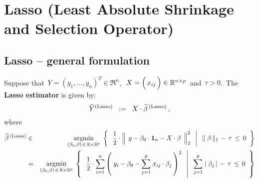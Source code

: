 
\section{Lasso (Least Absolute Shrinkage and Selection Operator)}
\setcounter{theorem}{0}

\renewcommand{\theenumi}{\roman{enumi}}
\renewcommand{\labelenumi}{\textnormal{(\theenumi)}$\;\;$}


\vskip 0.3cm
\subsection{Lasso -- general formulation}
\vskip 0.0cm
\noindent
Suppose that
\,$Y = (y_{1},\ldots,y_{n})^{T} \in \Re^{n}$,\,
\,$X = \left(\,\overset{{\color{white}-}}{x_{ij}}\,\right)\in\Re^{n \times p}$\, and
\,$\tau > 0$.\,
The \textbf{Lasso estimator} is given by:
\begin{equation*}
\widehat{Y}^{\textnormal{(Lasso)}}
\;\; := \;\;
	X \cdot \widehat{\beta}^{\,\textnormal{(Lasso)}}\,,
\end{equation*}
where
\begin{eqnarray*}
\widehat{\beta}^{\,\textnormal{(Lasso)}}
& \in &
	\underset{(\beta_{0},\beta)\,\in\,\Re\times\Re^{p}}{\argmin}\;
	\left\{\;\;
		\left.
		\dfrac{1}{2}
		\cdot
		\left\Vert\;\, y \overset{{\color{white}.}}{-} \beta_{0}\cdot\mathbf{1}_{n} - X\cdot\beta \,\;\right\Vert_{2}^{2}
		\;\;\,\right\vert\;\;
		\Vert\;\beta\,\Vert_{1} \, - \, \tau \, \leq \, 0
		\;\;\right\}
\\
& = &
	\underset{(\beta_{0},\beta)\,\in\,\Re\times\Re^{p}}{\argmin}\;
	\left\{\;\;
		\left.
		\dfrac{1}{2}
		\cdot
		\overset{n}{\underset{i=1}{\sum}}
		\left(\; y_{i} - \beta_{0} - \overset{p}{\underset{j=1}{\sum}}\; x_{ij}\cdot\beta_{j}\,\right)^{2}
		\;\;\,\right\vert\;\;
		\overset{p}{\underset{j=1}{\sum}}\;
		\vert\;\beta_{j}\,\vert
		\, - \,
		\tau \, \leq \, 0
		\;\;\right\}
\end{eqnarray*}


\vskip 0.5cm
